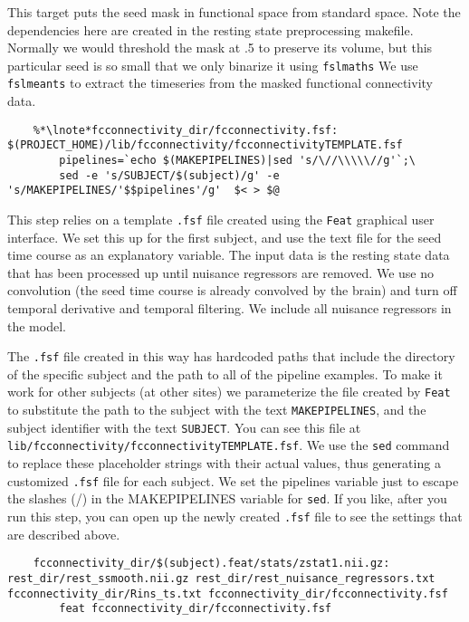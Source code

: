 This target puts the seed mask in functional space from
standard space. Note the dependencies here are created in the resting
state preprocessing makefile. Normally we would threshold the mask at
.5 to preserve its volume, but this particular seed is so small that
we only binarize it using \texttt{fslmaths}
 We use \texttt{fslmeants} to extract the timeseries from the
masked functional connectivity data.

\begin{lstlisting}
	%*\lnote*fcconnectivity_dir/fcconnectivity.fsf: $(PROJECT_HOME)/lib/fcconnectivity/fcconnectivityTEMPLATE.fsf
		pipelines=`echo $(MAKEPIPELINES)|sed 's/\//\\\\\//g'`;\
		sed -e 's/SUBJECT/$(subject)/g' -e 's/MAKEPIPELINES/'$$pipelines'/g'  $< > $@
\end{lstlisting}
This step relies on a template \texttt{.fsf} file created using the
\texttt{Feat} graphical user interface. We set this up for the first
subject, and use the text file for the seed time course as an
explanatory variable. The input data is the resting state data that
has been processed up until nuisance regressors are removed. 
We use no convolution (the seed time course is
already convolved by the brain) and turn off temporal derivative and
temporal filtering. We include all nuisance regressors in the model. 

The \texttt{.fsf} file created
in this way has hardcoded paths that include the directory of the
specific subject and the path to all of the pipeline examples. To make
it work for other subjects (at other sites) we parameterize the file
created by \texttt{Feat} to substitute the path to the subject with
the text \texttt{MAKEPIPELINES}, and the subject identifier with the
text \texttt{SUBJECT}. You can see this file at
\texttt{lib/fcconnectivity/fcconnectivityTEMPLATE.fsf}. We use the
\texttt{sed} command to replace these placeholder strings with their
actual values, thus generating a customized \texttt{.fsf} file for
each subject. We set the pipelines variable just to escape the slashes
(/) in the MAKEPIPELINES variable for \texttt{sed}.
If you like, after you run this step, you can open up the newly
created \texttt{.fsf} file to see the settings that are described above.
\begin{lstlisting}		
	fcconnectivity_dir/$(subject).feat/stats/zstat1.nii.gz: rest_dir/rest_ssmooth.nii.gz rest_dir/rest_nuisance_regressors.txt fcconnectivity_dir/Rins_ts.txt fcconnectivity_dir/fcconnectivity.fsf 
		feat fcconnectivity_dir/fcconnectivity.fsf 
\end{lstlisting}

